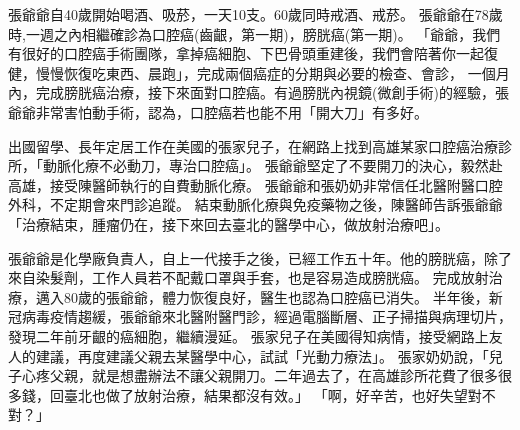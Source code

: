 \documentclass[12pt, a4paper]{article}
\begin{document}
張爺爺自40歲開始喝酒、吸菸，一天10支。60歲同時戒酒、戒菸。
張爺爺在78歲時,一週之內相繼確診為口腔癌(齒齦，第一期)，膀胱癌(第一期)。
「爺爺，我們有很好的口腔癌手術團隊，拿掉癌細胞、下巴骨頭重建後，我們會陪著你一起復健，慢慢恢復吃東西、晨跑」，完成兩個癌症的分期與必要的檢查、會診，
一個月內，完成膀胱癌治療，接下來面對口腔癌。有過膀胱內視鏡(微創手術)的經驗，張爺爺非常害怕動手術，認為，口腔癌若也能不用「開大刀」有多好。

出國留學、長年定居工作在美國的張家兒子，在網路上找到高雄某家口腔癌治療診所，「動脈化療不必動刀，專治口腔癌」。
張爺爺堅定了不要開刀的決心，毅然赴高雄，接受陳醫師執行的自費動脈化療。
張爺爺和張奶奶非常信任北醫附醫口腔外科，不定期會來門診追蹤。
結束動脈化療與免疫藥物之後，陳醫師告訴張爺爺「治療結束，腫瘤仍在，接下來回去臺北的醫學中心，做放射治療吧」。

張爺爺是化學廠負責人，自上一代接手之後，已經工作五十年。他的膀胱癌，除了來自染髮劑，工作人員若不配戴口罩與手套，也是容易造成膀胱癌。
完成放射治療，邁入80歲的張爺爺，體力恢復良好，醫生也認為口腔癌已消失。
半年後，新冠病毒疫情趨緩，張爺爺來北醫附醫門診，經過電腦斷層、正子掃描與病理切片，發現二年前牙齦的癌細胞，繼續漫延。
張家兒子在美國得知病情，接受網路上友人的建議，再度建議父親去某醫學中心，試試「光動力療法」。
張家奶奶說，「兒子心疼父親，就是想盡辦法不讓父親開刀。二年過去了，在高雄診所花費了很多很多錢，回臺北也做了放射治療，結果都沒有效。」
「啊，好辛苦，也好失望對不對？」
\end{document}
